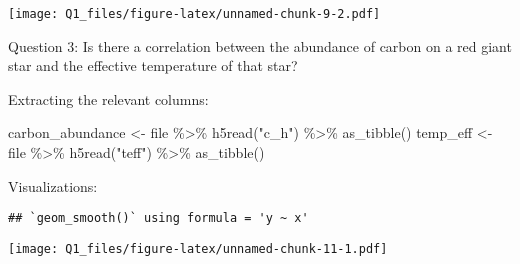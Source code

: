 \documentclass[
]{article}
\newenvironment{Shaded}{\begin{snugshade}}{\end{snugshade}}
\newcommand{\AttributeTok}[1]{\textcolor[rgb]{0.77,0.63,0.00}{#1}}
\newcommand{\ConstantTok}[1]{\textcolor[rgb]{0.00,0.00,0.00}{#1}}
\newcommand{\FunctionTok}[1]{\textcolor[rgb]{0.00,0.00,0.00}{#1}}
\newcommand{\NormalTok}[1]{#1}
\newcommand{\OtherTok}[1]{\textcolor[rgb]{0.56,0.35,0.01}{#1}}
\newcommand{\SpecialCharTok}[1]{\textcolor[rgb]{0.00,0.00,0.00}{#1}}
\newcommand{\StringTok}[1]{\textcolor[rgb]{0.31,0.60,0.02}{#1}}
\begin{document}
\texttt{[image: Q1\_files/figure-latex/unnamed-chunk-9-2.pdf]}

Question 3: Is there a correlation between the abundance of carbon on a
red giant star and the effective temperature of that star?

Extracting the relevant columns:

\begin{Shaded}
\begin{Highlighting}[]
\NormalTok{carbon\_abundance }\OtherTok{\textless{}{-}}\NormalTok{ file }\SpecialCharTok{\%\textgreater{}\%} \FunctionTok{h5read}\NormalTok{(}\StringTok{"c\_h"}\NormalTok{) }\SpecialCharTok{\%\textgreater{}\%} \FunctionTok{as\_tibble}\NormalTok{() }
\NormalTok{temp\_eff }\OtherTok{\textless{}{-}}\NormalTok{ file }\SpecialCharTok{\%\textgreater{}\%} \FunctionTok{h5read}\NormalTok{(}\StringTok{"teff"}\NormalTok{) }\SpecialCharTok{\%\textgreater{}\%} \FunctionTok{as\_tibble}\NormalTok{()}
\end{Highlighting}
\end{Shaded}

Visualizations:

\begin{Shaded}
\end{Shaded}

\begin{verbatim}
## `geom_smooth()` using formula = 'y ~ x'
\end{verbatim}

\texttt{[image: Q1\_files/figure-latex/unnamed-chunk-11-1.pdf]}
\end{document}
